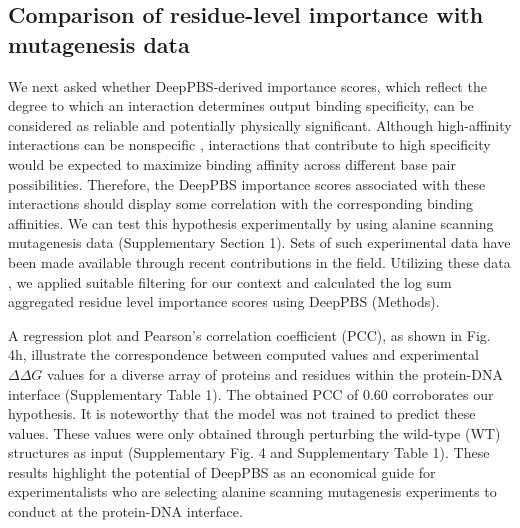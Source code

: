 \subsection{Comparison of residue-level importance with mutagenesis data}
We next asked whether DeepPBS-derived importance scores, which reflect the degree to which an interaction determines output binding specificity, can be considered as reliable and potentially physically significant. Although high-affinity interactions can be nonspecific \citep{Agback1998, Peterson2007}, interactions that contribute to high specificity would be expected to maximize binding affinity across different base pair possibilities. Therefore, the DeepPBS importance scores associated with these interactions should display some correlation with the corresponding binding affinities. We can test this hypothesis experimentally by using alanine scanning mutagenesis data (Supplementary Section 1). Sets of such experimental data have been made available through recent contributions\citep{Ovek2022} in the field. Utilizing these data \citep{Peng2018}, we applied suitable filtering for our context and calculated the log sum aggregated residue level importance scores using DeepPBS (Methods).
\par
A regression plot and Pearson’s correlation coefficient (PCC), as shown in Fig. 4h, illustrate the correspondence between computed values and experimental $\Delta\Delta G$ values for a diverse array of proteins and residues within the protein-DNA interface (Supplementary Table 1). The obtained PCC of 0.60 corroborates our hypothesis. It is noteworthy that the model was not trained to predict these values. These values were only obtained through perturbing the wild-type (WT) structures as input (Supplementary Fig. 4 and Supplementary Table 1). These results highlight the potential of DeepPBS as an economical guide for experimentalists who are selecting alanine scanning mutagenesis experiments to conduct at the protein-DNA interface.

